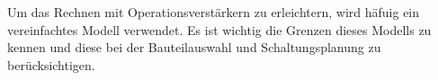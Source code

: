 \begin{frame}
{     %
                

        \begin{Merksatz}{}  
            Um das Rechnen mit Operationsverstärkern zu erleichtern, wird häfuig ein vereinfachtes Modell verwendet. 
            Es ist wichtig die Grenzen dieses Modells zu kennen und diese bei der Bauteilauswahl und Schaltungsplanung zu berücksichtigen. 
        \end{Merksatz}
        }


\end{frame}
